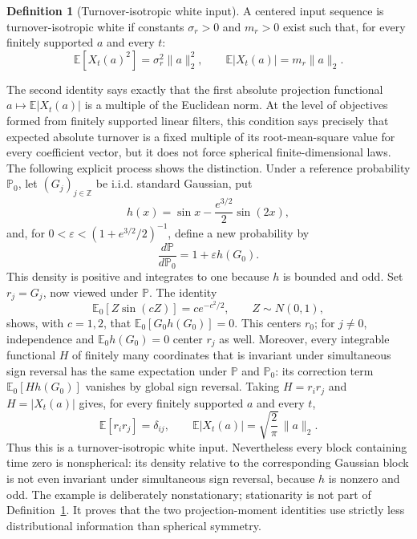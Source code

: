 \documentclass[11pt]{amsart}
\theoremstyle{definition}
\newtheorem{definition}[theorem]{Definition}
\theoremstyle{remark}
\begin{document}
\begin{definition}[Turnover-isotropic white input]\label{def:turnover-isotropic}
A centered input sequence is turnover-isotropic white if constants
$\sigma_r>0$ and $m_r>0$ exist such that, for every finitely supported $a$ and
every $t$:
\begin{equation}\label{eq:turnover-isotropy}
 \mathbb E[X_t(a)^2]=\sigma_r^2\|a\|_2^2,
 \qquad
 \mathbb E|X_t(a)|=m_r\|a\|_2.
\end{equation}
\end{definition}

The second identity says exactly that the first absolute projection functional
$a\mapsto\mathbb E|X_t(a)|$ is a multiple of the Euclidean norm. At the level
of objectives formed from finitely supported linear filters, this condition
says precisely that expected absolute turnover is a fixed multiple of its
root-mean-square value for every coefficient vector, but it does not force
spherical finite-dimensional laws. The following explicit process shows the
distinction. Under a reference probability $\mathbb P_0$, let
$(G_j)_{j\in\mathbb Z}$ be i.i.d. standard Gaussian, put
\[
 h(x)=\sin x-\frac{e^{3/2}}2\sin(2x),
\]
and, for $0<\varepsilon<(1+e^{3/2}/2)^{-1}$, define a new probability by
\[
 \frac{d\mathbb P}{d\mathbb P_0}
 =1+\varepsilon h(G_0).
\]
This density is positive and integrates to one because $h$ is bounded and odd.
Set $r_j=G_j$, now viewed under $\mathbb P$. The
identity
\[
 \mathbb E_0[Z\sin(cZ)]=c e^{-c^2/2},
 \qquad Z\sim N(0,1),
\]
shows, with $c=1,2$, that
$\mathbb E_0[G_0h(G_0)]=0$. This centers $r_0$; for $j\neq0$, independence
and $\mathbb E_0h(G_0)=0$ center $r_j$ as well.
Moreover, every integrable functional $H$ of finitely many coordinates that
is invariant under simultaneous sign reversal has the same expectation under
$\mathbb P$ and $\mathbb P_0$: its correction term
$\mathbb E_0[Hh(G_0)]$ vanishes by global sign reversal. Taking
$H=r_ir_j$ and $H=|X_t(a)|$ gives, for every finitely supported $a$ and every
$t$,
\[
 \mathbb E[r_ir_j]=\delta_{ij},
 \qquad
 \mathbb E|X_t(a)|
 =\sqrt{\frac2\pi}\,\|a\|_2.
\]
Thus this is a turnover-isotropic white input. Nevertheless every block
containing time zero is nonspherical: its density relative to the corresponding
Gaussian block is not even invariant under simultaneous sign reversal, because
$h$ is nonzero and odd. The example is deliberately nonstationary; stationarity
is not part of Definition~\ref{def:turnover-isotropic}. It proves that the two
projection-moment identities use strictly less distributional information than
spherical symmetry.
\end{document}
